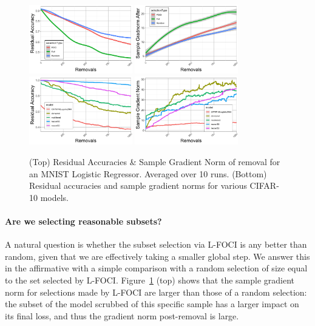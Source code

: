 \begin{figure}
    \centering
    \includegraphics[width=0.4\textwidth]{5_unlearn/figs/scrub/MNIST_Resid_Acc.png}
     \includegraphics[width=0.4\textwidth]{5_unlearn/figs/scrub/MNIST_GradNorm_Logistic.png}
    \includegraphics[width=0.4\textwidth]{5_unlearn/figs/scrub/cifar_resid.png}
    \includegraphics[width=0.4\textwidth]{5_unlearn/figs/scrub/CIFAR_gradnom.png}
    \caption[Residual accuracies and gradient norms]{(Top) Residual Accuracies \& Sample Gradient Norm of removal for an MNIST Logistic Regressor. Averaged over 10 runs. (Bottom) Residual accuracies and sample gradient norms for various CIFAR-10 models.}
    \label{fig:mnistcifar}
\end{figure}


\paragraph{Are we selecting reasonable subsets?} A natural question is whether the subset selection via L-FOCI is any better than random, given that we are effectively taking a smaller global step. We answer this in the affirmative with a simple comparison with a random selection of size equal to the set selected by L-FOCI. Figure~\ref{fig:mnistcifar} (top) shows that the sample gradient norm for selections made by L-FOCI are larger than those of a random selection: the subset of the model scrubbed of this specific sample has a larger impact on its final loss, and thus the gradient norm post-removal is large.


